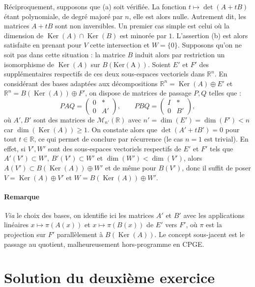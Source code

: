Réciproquement, supposons que (a) soit vérifiée. La fonction $t \mapsto \det(A + tB)$ étant polynomiale, de degré majoré par $n$, elle est alors nulle. Autrement dit, les matrices $A+tB$ sont non inversibles. Un premier cas simple est celui où la dimension de $\operatorname{Ker}(A) \cap \operatorname{Ker}(B)$ est minorée par $1$. L'assertion (b) est alors satisfaite en prenant pour $V$ cette intersection et $W = \{0\}$. Supposons qu'on ne soit pas dans cette situation :  la matrice $B$ induit alors par restriction un isomorphisme de $\operatorname{Ker}(A)$ sur $B(\operatorname{Ker(A)})$.
Soient $E'$ et $F'$ des supplémentaires respectifs de ces deux sous-espaces vectoriels dans $\mathbb R^n$. En considérant des bases adaptées aux décompositions $\mathbb R^n = \operatorname{Ker}(A)\oplus E'$ et $\mathbb R^n = B(\operatorname{Ker}(A))\oplus F'$, on dispose de matrices de passage $P,Q$  telles que :
\[
PAQ = \begin{pmatrix}0 & *\\0 & A'\end{pmatrix},
\qquad
PBQ = \begin{pmatrix}I & *\\0 & B'\end{pmatrix},
\]
où $A',B'$ sont des matrices de $\mathscr M_{n'}(\mathbb R)$ avec $n' = \dim(E') = \dim(F') < n$ car $\dim(\operatorname{Ker}(A)) \geqslant 1$.
On constate alors que $\det(A' + t B') = 0$ pour tout $t\in\mathbb R$, ce qui permet de conclure par récurrence (le cas $n = 1$ est trivial). En effet, si $V',W'$ sont des sous-espaces vectoriels respectifs de $E'$ et $F'$ tels que $A'(V') \subset W'$, $B'(V') \subset W'$ et $\dim(W') < \dim(V')$, alors $A(V') \subset B(\operatorname{Ker}(A)) \oplus W'$ et de même pour $B(V')$, donc il suffit de poser $V = \operatorname{Ker}(A) \oplus V'$ et $W = B(\operatorname{Ker}(A)) \oplus W'$.

\paragraph{Remarque} \textit{Via} le choix des bases, on identifie ici les matrices $A'$ et $B'$ avec les applications linéaires $x \mapsto \pi(A(x))$ et $x \mapsto \pi(B(x))$ de $E'$ vers $F'$, où $\pi$ est la projection sur $F'$ parallèlement à $B(\operatorname{Ker}(A))$. Le concept sous-jacent est le passage au quotient, malheureusement hors-programme en CPGE.

\section{Solution du deuxième exercice} %

